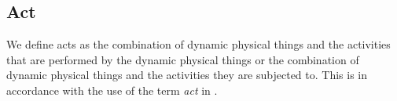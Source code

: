 \subsection{Act}
\label{sec:act}

We define acts as the combination of \cstartc dynamic physical things \cendc and the activities that are performed by the dynamic physical things or the combination of dynamic physical things and the activities they are subjected to.  %
This is in accordance with the use of the term \emph{act} in \autocite{openscenario}. 
